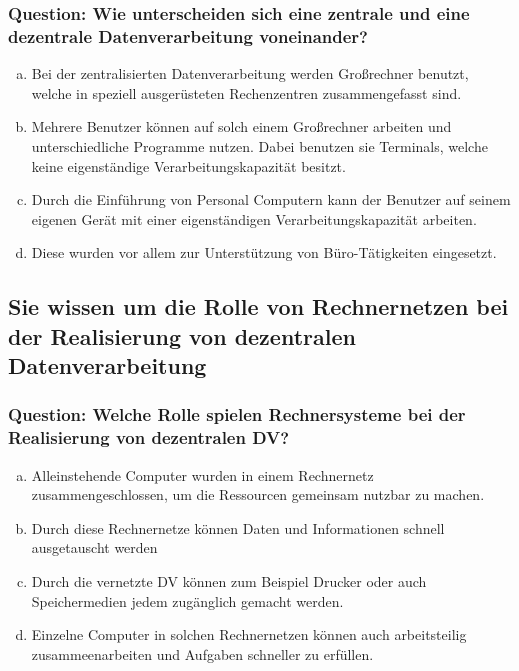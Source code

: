 \documentclass{article}
\begin{document}
\begin{adjustwidth}{2em}{2em}
\begin{adjustwidth}{2em}{2em}
\begin{adjustwidth}{1em}{}
				\subsubsection*{Question: Wie unterscheiden sich eine zentrale und eine dezentrale Datenverarbeitung voneinander?}
				\begin{adjustwidth}{1em}{}
					\begin{enumerate}[(a)]
						\item Bei der zentralisierten Datenverarbeitung werden Großrechner benutzt, welche in speziell ausgerüsteten Rechenzentren zusammengefasst sind.
						\item Mehrere Benutzer können auf solch einem Großrechner arbeiten und unterschiedliche Programme nutzen. Dabei benutzen sie Terminals, welche keine eigenständige Verarbeitungskapazität besitzt.
						\item Durch die Einführung von Personal Computern kann der Benutzer auf seinem eigenen Gerät mit einer eigenständigen Verarbeitungskapazität arbeiten.
						\item Diese wurden vor allem zur Unterstützung von Büro-Tätigkeiten eingesetzt.
					\end{enumerate}
				\end{adjustwidth}
			\end{adjustwidth}
			\subsection{Sie wissen um die Rolle von Rechnernetzen bei der Realisierung von dezentralen Datenverarbeitung}
			\begin{adjustwidth}{1em}{}
				\subsubsection*{Question: Welche Rolle spielen Rechnersysteme bei der Realisierung von dezentralen DV?}
				\begin{adjustwidth}{1em}{}
					\begin{enumerate}[(a)]
						\item Alleinstehende Computer wurden in einem Rechnernetz zusammengeschlossen, um die Ressourcen gemeinsam nutzbar zu machen.
						\item Durch diese Rechnernetze können Daten und Informationen schnell ausgetauscht werden
						\item Durch die vernetzte DV können zum Beispiel Drucker oder auch Speichermedien jedem zugänglich gemacht werden.
						\item Einzelne Computer in solchen Rechnernetzen können auch arbeitsteilig zusammeenarbeiten und Aufgaben schneller zu erfüllen.
					\end{enumerate}
				\end{adjustwidth}
			\end{adjustwidth}

\end{adjustwidth}
\end{adjustwidth}
\end{document}
